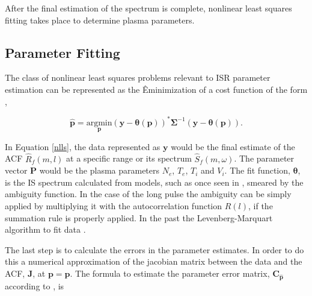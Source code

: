 
After the final estimation of the spectrum is complete, nonlinear least squares fitting takes place to determine plasma parameters.  

\subsection{Parameter Fitting}
The class of nonlinear least squares problems relevant to ISR parameter estimation can be represented as the Êminimization of a cost function of the form \cite{kayvol1},

\begin{equation}
	\mathbf{\hat{p}}= \underset{\mathbf{p}}{\text{argmin}} (\mathbf{y}-\bm{\theta}(\mathbf{p}))^*\bm{\Sigma}^{-1}(\mathbf{y}-\bm{\theta}(\mathbf{p})).
\label{nlls}
\end{equation}

In Equation \ref{nlls}, the data represented as $\mathbf{y}$ would be the final estimate of the ACF $\widehat{R}_f(m,l)$ at a specific range or its spectrum $\widehat{S}_f(m,\omega)$. The parameter vector $\mathbf{P}$ would be the plasma parameters $N_e$, $T_e$, $T_i$ and $V_i$. The fit function, $\bm{\theta}$, is the IS spectrum calculated from models, such as once seen in \cite{kudeki:milla:1}, smeared by the ambiguity function. In the case of the long pulse the ambiguity can be simply applied by multiplying it with the autocorrelation function $R(l)$, if the summation rule is properly applied. In the past the Levenberg-Marquart algorithm to fit data \cite{nikoukar2008}.


The last step is to calculate the errors in the parameter estimates. In order to do this a numerical approximation of the jacobian matrix between the data and the ACF, $\mathbf{J}$, at $\mathbf{p}=\mathbf{\hat{p}}$. The formula to estimate the parameter error matrix, $\mathbf{C}_{\mathbf{\hat{p}}}$ according to \cite{Hysell:2000cq}, is


